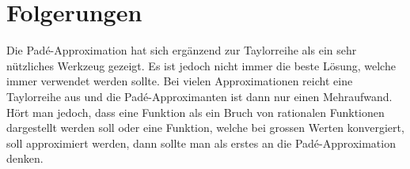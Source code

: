%
%
%
\section{Folgerungen
\label{pade:section:folgerungen}}
Die Padé-Approximation hat sich ergänzend zur Taylorreihe als ein sehr nützliches Werkzeug gezeigt.
Es ist jedoch nicht immer die beste Lösung, welche immer verwendet werden sollte.
Bei vielen Approximationen reicht eine Taylorreihe aus und die Padé-Approximanten ist dann nur einen Mehraufwand.
Hört man jedoch, dass eine Funktion als ein Bruch von rationalen Funktionen dargestellt werden soll oder  
eine Funktion, welche bei grossen Werten konvergiert, soll approximiert werden, dann sollte man als erstes an die Padé-Approximation denken.





